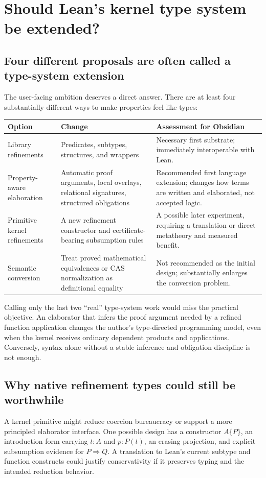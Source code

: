 \documentclass[11pt,a4paper]{article}
\theoremstyle{plain}\newtheorem{proposition}{Proposition}[section]
\theoremstyle{definition}\newtheorem{definition}[proposition]{Definition}
\theoremstyle{remark}\newtheorem{remark}[proposition]{Remark}
\begin{document}
\section{Should Lean's kernel type system be extended?}\label{sec:kernel}
\subsection{Four different proposals are often called a type-system extension}
The user-facing ambition deserves a direct answer. There are at least four substantially different ways to make properties feel like types:
\begin{center}\small
\begin{tabularx}{\textwidth}{@{}P{.22\textwidth}Y Y@{}}
\toprule
Option & Change & Assessment for Obsidian\\
\midrule
Library refinements & Predicates, subtypes, structures, and wrappers & Necessary first substrate; immediately interoperable with Lean.\\
Property-aware elaboration & Automatic proof arguments, local overlays, relational signatures, structured obligations & Recommended first language extension; changes how terms are written and elaborated, not accepted logic.\\
Primitive kernel refinements & A new refinement constructor and certificate-bearing subsumption rules & A possible later experiment, requiring a translation or direct metatheory and measured benefit.\\
Semantic conversion & Treat proved mathematical equivalences or CAS normalization as definitional equality & Not recommended as the initial design; substantially enlarges the conversion problem.\\
\bottomrule
\end{tabularx}
\end{center}

Calling only the last two ``real'' type-system work would miss the practical objective. An elaborator that infers the proof argument needed by a refined function application changes the author's type-directed programming model, even when the kernel receives ordinary dependent products and applications. Conversely, syntax alone without a stable inference and obligation discipline is not enough.

\subsection{Why native refinement types could still be worthwhile}
A kernel primitive might reduce coercion bureaucracy or support a more principled elaborator interface. One possible design has a constructor \(A\{P\}\), an introduction form carrying \(t:A\) and \(p:P(t)\), an erasing projection, and explicit subsumption evidence for \(P\Rightarrow Q\). A translation to Lean's current subtype and function constructs could justify conservativity if it preserves typing and the intended reduction behavior.
\end{document}
